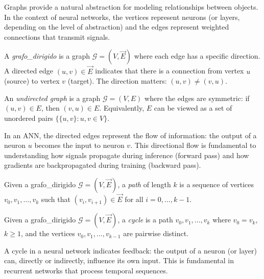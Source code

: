 Graphs provide a natural abstraction for modeling relationships between objects. In the context of neural networks, the vertices represent neurons (or layers, depending on the level of abstraction) and the edges represent weighted connections that transmit signals.

\begin{definition}\label{def:grafo_dirigido}
A \textit{\gls{grafo_dirigido}} is a graph $\mathcal{G} = (V, \vec{E})$ where each edge has a specific direction. A directed edge $(u, v) \in \vec{E}$ indicates that there is a connection from vertex $u$ (source) to vertex $v$ (target). The direction matters: $(u, v) \neq (v, u)$.
\end{definition}

\begin{definition}\label{def:grafo_no_dirigido}
An \textit{undirected graph} is a graph $\mathcal{G} = (V, E)$ where the edges are symmetric: if $(u, v) \in E$, then $(v, u) \in E$. Equivalently, $E$ can be viewed as a set of unordered pairs $\{\{u, v\} : u, v \in V\}$.
\end{definition}

In an \gls{ANN}, the directed edges represent the flow of information: the output of a neuron $u$ becomes the input to neuron $v$. This directional flow is fundamental to understanding how signals propagate during inference (forward pass) and how gradients are backpropagated during training (backward pass).

\begin{definition}\label{def:camino}
Given a \gls{grafo_dirigido} $\mathcal{G} = (V, \vec{E})$, a \textit{path} of length $k$ is a sequence of vertices $v_0, v_1, \ldots, v_k$ such that $(v_i, v_{i+1}) \in \vec{E}$ for all $i = 0, \ldots, k-1$.
\end{definition}

\begin{definition}\label{def:ciclo}
Given a \gls{grafo_dirigido} $\mathcal{G} = (V, \vec{E})$, a \textit{cycle} is a path $v_0, v_1, \ldots, v_k$ where $v_0 = v_k$, $k \geq 1$, and the vertices $v_0, v_1, \ldots, v_{k-1}$ are pairwise distinct.
\end{definition}

A cycle in a neural network indicates feedback: the output of a neuron (or layer) can, directly or indirectly, influence its own input. This is fundamental in recurrent networks that process temporal sequences.

